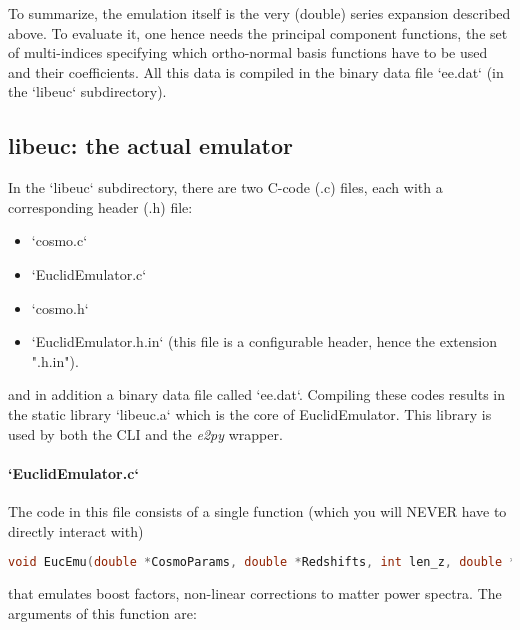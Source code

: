 \documentclass[american,11pt]{article}
\begin{document}
To summarize, the emulation itself is the very (double) series expansion described above. To evaluate it, one hence needs the principal component functions, the set of multi-indices specifying which ortho-normal basis functions have to be used and their coefficients. All this data is compiled in the binary data file `ee.dat` (in the `libeuc` subdirectory).

\subsection{libeuc: the actual emulator}
In the `libeuc` subdirectory, there are two C-code (.c) files, each with a corresponding header (.h) file: 

\begin{itemize}
\item `cosmo.c`
\item `EuclidEmulator.c`
\item `cosmo.h`
\item `EuclidEmulator.h.in` (this file is a configurable header, hence the extension ".h.in").
\end{itemize}

and in addition a binary data file called `ee.dat`. Compiling these codes results in the static library `libeuc.a` which is the core of EuclidEmulator. This library is used by both the CLI and the \textit{e2py} wrapper.

\paragraph{`EuclidEmulator.c`}
The code in this file consists of a single function (which you will NEVER have to directly interact with)

\begin{lstlisting}[language=C]
   void EucEmu(double *CosmoParams, double *Redshifts, int len_z, double **kVals, int *nkVals, double **Boost, int *nBoost)
\end{lstlisting}

that emulates boost factors, non-linear corrections to matter power spectra. The arguments of this function are:
\end{document}

